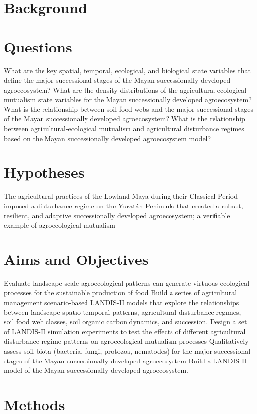 
\section{Background}

\section{Questions}
\begin{outline}
\1 What are the key spatial, temporal, ecological, and biological state variables that define the major successional stages of the Mayan successionally developed agroecosystem?
\1 What are the density distributions of the agricultural-ecological mutualism state variables for the Mayan successionally developed agroecosystem?
\1 What is the relationship between soil food webs and the major successional stages of the Mayan successionally developed agroecosystem?
\1 What is the relationship between agricultural-ecological mutualism and agricultural disturbance regimes based on the Mayan successionally developed agroecosystem model?
\end{outline}



\section{Hypotheses}
\begin{outline}
\1 The agricultural practices of the Lowland Maya during their Classical Period imposed a disturbance regime on the Yucat\'{a}n Peninsula that created a robust, resilient, and adaptive successionally developed agroecosystem; a verifiable example of agroecological mutualism


\end{outline}


\section{Aims and Objectives}
\begin{outline}
\1 Evaluate landscape-scale agroecological patterns can generate virtuous ecological processes for the sustainable production of food
\1 Build a series of agricultural management scenario-based LANDIS-II models that explore the relationships between landscape spatio-temporal patterns, agricultural disturbance regimes, soil food web classes, soil organic carbon dynamics, and succession.
\1 Design a set of LANDIS-II simulation experiments to test the effects of different agricultural disturbance regime patterns on agroecological mutualism processes
\1 Qualitatively assess soil biota (bacteria, fungi, protozoa, nematodes) for the major successional stages of the Mayan successionally developed agroecosystem
\1 Build a LANDIS-II model of the Mayan successionally developed agroecosystem.

\end{outline}



\section{Methods}
